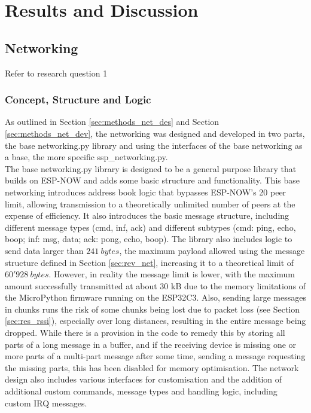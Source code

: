 \cleardoublepage%
\chapter{\label{chap:res}Results and Discussion}%


\section{\label{sec:res_networking}Networking}%

Refer to research question 1

\subsection{\label{sec:res_logic}Concept, Structure and Logic}

As outlined in Section \ref{sec:methods_net_des} and Section \ref{sec:methods_net_dev}, the networking was designed and developed in two parts, the base networking.py library and using the interfaces of the base networking as a base, the more specific ssp\_networking.py. \\

The base networking.py library is designed to be a general purpose library that builds on ESP-NOW and adds some basic structure and functionality. This base networking introduces address book logic that bypasses ESP-NOW's 20 peer limit, allowing transmission to a theoretically unlimited number of peers at the expense of efficiency. It also introduces the basic message structure, including different message types (cmd, inf, ack) and different subtypes (cmd: ping, echo, boop; inf: msg, data; ack: pong, echo, boop). The library also includes logic to send data larger than $241\ bytes$, the maximum payload allowed using the message structure defined in Section \ref{sec:rev_net}, increasing it to a theoretical limit of $60'928\ bytes$. However, in reality the message limit is lower, with the maximum amount successfully transmitted at about 30 kB due to the memory limitations of the MicroPython firmware running on the ESP32C3. Also, sending large messages in chunks runs the risk of some chunks being lost due to packet loss (see Section \ref{sec:res_rssi}), especially over long distances, resulting in the entire message being dropped. While there is a provision in the code to remedy this by storing all parts of a long message in a buffer, and if the receiving device is missing one or more parts of a multi-part message after some time, sending a message requesting the missing parts, this has been disabled for memory optimisation. 
The network design also includes various interfaces for customisation and the addition of additional custom commands, message types and handling logic, including custom IRQ messages. \\

